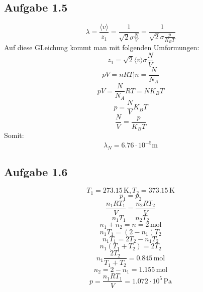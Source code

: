 \documentclass{article}
\begin{document}
\subsection*{Aufgabe 1.5}
\begin{equation*}
    \lambda = \frac{\langle v \rangle}{z_1}=\frac{1}{\sqrt{2}\sigma \frac{N}{V}}=\frac{1}{\sqrt{2}\sigma \frac{p}{K_BT}}
\end{equation*}
Auf diese GLeichung kommt man mit folgenden Umformungen:
\begin{equation*}
     z_1 = \sqrt{2} \langle v \rangle \sigma \frac{N}{V}
\end{equation*}
\begin{equation*}
    pV = nRT | n = \frac{N}{N_A}
\end{equation*}
\begin{equation*}
    pV = \frac{N}{N_A} RT = NK_BT
\end{equation*}
\begin{equation*}
    p = \frac{N}{V}K_BT
\end{equation*}
\begin{equation*}
    \frac{N}{V} = \frac{p}{K_BT}
\end{equation*}
Somit:
\begin{equation*}
    \lambda_N = 6.76 \cdot 10^{-5} \mathrm{m}
\end{equation*}

\subsection*{Aufgabe 1.6}
\begin{equation*}
    T_1 = 273.15 \, \mathrm{K}, T_2 = 373.15 \, \mathrm{K}
\end{equation*}
\begin{equation*}
    p_1 = p_2
\end{equation*}
\begin{equation*}
    \frac{n_1 R T_1}{V} = \frac{n_2 R T_2}{V}
\end{equation*}
\begin{equation*}
    n_1 T_1 = n_2 T_2
\end{equation*}
\begin{equation*}
    n_1 + n_2 = n = 2 \, \mathrm{mol}
\end{equation*}
\begin{equation*}
    n_1T_1=(2-n_1)T_2
\end{equation*}
\begin{equation*}
    n_1T_1=2T_2-n_1T_2
\end{equation*}
\begin{equation*}
    n_1(T_1+T_2)=2T_2
\end{equation*}
\begin{equation*}
    n_1\frac{2T_2}{T_1 + T_2} = 0.845 \, \mathrm{mol}
\end{equation*}
\begin{equation*}
    n_2 = 2 - n_1 = 1.155 \, \mathrm{mol}
\end{equation*}
\begin{equation*}
    p = \frac{n_1RT_1}{V} = 1.072 \cdot 10^5 \, \mathrm{Pa}
\end{equation*}
\end{document}
